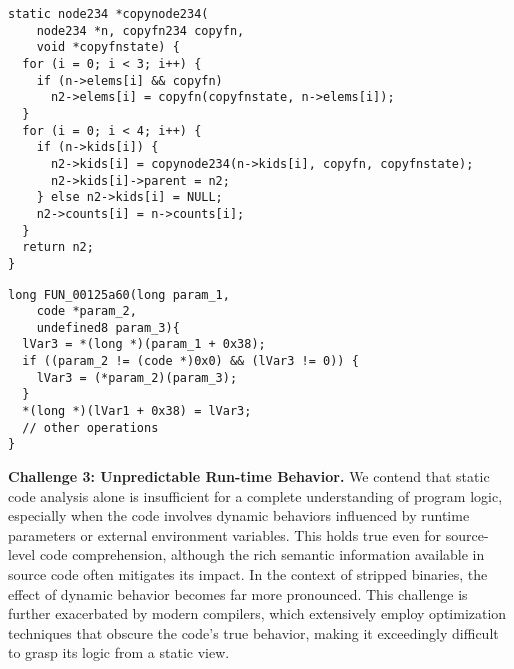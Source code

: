\documentclass[acmsmall,screen,review,anonymous]{acmart} %
\begin{document}
\begin{minipage}[t]{0.45\textwidth}
\centering
\begin{lstlisting}[caption={copynode234}, basicstyle=\ttfamily\scriptsize,
keywordstyle=\color{magenta}\bfseries\scriptsize,
commentstyle=\color{Green}\itshape\scriptsize]
static node234 *copynode234(
    node234 *n, copyfn234 copyfn,
    void *copyfnstate) {
  for (i = 0; i < 3; i++) {
    if (n->elems[i] && copyfn)
      n2->elems[i] = copyfn(copyfnstate, n->elems[i]);
  }
  for (i = 0; i < 4; i++) {
    if (n->kids[i]) {
      n2->kids[i] = copynode234(n->kids[i], copyfn, copyfnstate);
      n2->kids[i]->parent = n2;
    } else n2->kids[i] = NULL;
    n2->counts[i] = n->counts[i];
  }
  return n2;
}
\end{lstlisting}
\end{minipage}
\vspace{0.3em}
\hfill
\begin{minipage}[t]{0.45\textwidth}
\centering
\begin{lstlisting}[caption={Pseudocode of copynode234}, basicstyle=\ttfamily\scriptsize,
keywordstyle=\color{magenta}\bfseries\scriptsize,
commentstyle=\color{teal}\itshape\scriptsize]
long FUN_00125a60(long param_1,
    code *param_2,
    undefined8 param_3){
  lVar3 = *(long *)(param_1 + 0x38);
  if ((param_2 != (code *)0x0) && (lVar3 != 0)) {
    lVar3 = (*param_2)(param_3);
  }
  *(long *)(lVar1 + 0x38) = lVar3;
  // other operations
}
\end{lstlisting}
\end{minipage}
\vspace{0.1em}

\textbf{Challenge 3: Unpredictable Run-time Behavior.}
We contend that static code analysis alone is insufficient for a complete understanding of program logic, especially when the code involves dynamic behaviors influenced by runtime parameters or external environment variables. This holds true even for source-level code comprehension, although the rich semantic information available in source code often mitigates its impact. In the context of stripped binaries, the effect of dynamic behavior becomes far more pronounced. This challenge is further exacerbated by modern compilers, which extensively employ optimization techniques that obscure the code's true behavior, making it exceedingly difficult to grasp its logic from a static view\cite{sig_meet_opt}.
\end{document}
